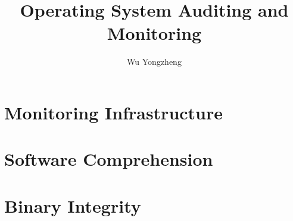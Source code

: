 \documentclass[a4paper,openany]{book}
\begin{document}
\title{Operating System Auditing and Monitoring}
\author{Wu Yongzheng}
\date{}

\frontmatter
\maketitle
\tableofcontents



\mainmatter

\chapter{Monitoring Infrastructure}



\chapter{Software Comprehension}


\chapter{Binary Integrity}





\backmatter


\end{document}
